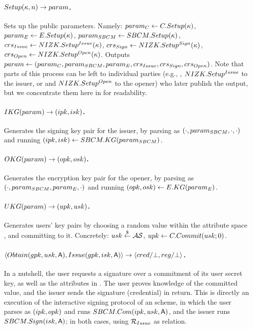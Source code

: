 \paragraph{$Setup(\kappa,n) \rightarrow param$.} %
Sets up the public parameters. Namely: $param_C \gets C.Setup(\kappa)$, $param_{E}
\gets E.Setup(\kappa)$, $param_{SBCM} \gets SBCM.Setup(\kappa)$,
$crs_{Issue} \gets NIZK.Setup^{Issue}(\kappa)$, $crs_{Sign} \gets
NIZK.Setup^{Sign} (\kappa)$, $crs_{Open}\gets NIZK.Setup^{Open}(\kappa)$.
Outputs $param \gets (param_C,param_{SBCM},param_{E},crs_{Issue},crs_{Sign},
crs_{Open})$. Note that parts of this process can be left to individual
parties (e.g., \SBCMSetup, $NIZK.Setup^{Issue}$ to the issuer, or \ESetup and
$NIZK.Setup^{Open}$ to the opener) who later publish the output, but we
concentrate them here in \Setup for readability.

\paragraph{$IKG(param) \rightarrow (ipk,isk)$.} %
Generates the signing key pair for the issuer, by parsing \parm as
$(\cdot,param_{SBCM},\cdot,\cdot)$ and running $(ipk,isk) \gets
SBCM.KG(param_{SBCM})$.

\paragraph{$OKG(param) \rightarrow (opk,osk)$.} %
Generates the encryption key pair for the opener, by parsing \parm as
$(\cdot,param_{SBCM},param_{E},\cdot)$ and running $(opk,osk) \gets
E.KG(param_{E})$.

\paragraph{$UKG(param) \rightarrow (upk,usk)$.} %
Generates users' key pairs by choosing a random value within the attribute space
\AttrSpace, and committing to it. Concretely: $usk \stackrel{\$}{\gets} \mathcal{AS}$, $upk
\gets C.Commit(usk; 0)$.

\paragraph{$\langle Obtain(gpk,usk,\mathsf{A}),Issue(gpk,isk,\mathsf{A}) \rangle
  \rightarrow \langle cred/\bot,reg/\bot \rangle$.} %
In a nutshell, the user requests a signature over a commitment of its user
secret key, as well as the attributes in \Attrs. The user proves knowledge of
the committed value, and the issuer sends the signature (credential) in return.
This is directly an execution of the interactive signing protocol of an \SBCM
scheme, in which the user parses \gpk as $(ipk,opk)$ and runs $SBCM.Com(ipk,
usk,\mathsf{A})$, and the issuer runs $SBCM.Sign(isk,\mathsf{A})$; in both cases,
using $\mathcal{R}_{Issue}$ as \NIZK relation.


